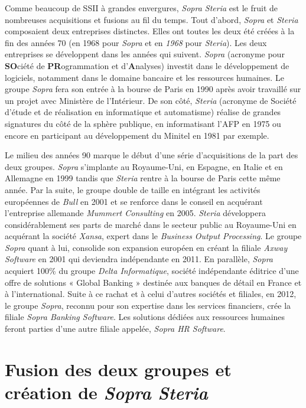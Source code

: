 \documentclass{polytech/polytech}
\begin{document}
Comme beaucoup de SSII à grandes envergures, \textit{Sopra Steria} est le fruit de nombreuses acquisitions et fusions au fil du temps. Tout d'abord, \textit{Sopra} et \textit{Steria} composaient deux entreprises distinctes. Elles ont toutes les deux été créées à la fin des années 70 (en 1968 pour \textit{Sopra} et en \textit{1968} pour \textit{Steria}). Les deux entreprises se développent dans les années qui suivent. \textit{Sopra} (acronyme pour \textbf{SO}ciété de \textbf{PR}ogrammation et d'\textbf{A}nalyses) investit dans le développement de logiciels, notamment dans le domaine bancaire et les ressources humaines. Le groupe \textit{Sopra} fera son entrée à la bourse de Paris en 1990 après avoir travaillé sur un projet avec Ministère de l'Intérieur. De son côté, \textit{Steria} (acronyme de Société d'étude et de réalisation en informatique et automatisme) réalise de grandes signatures du côté de la sphère publique, en informatisant l'AFP en 1975 ou encore en participant au développement du Minitel en 1981 par exemple. 

Le milieu des années 90 marque le début d'une série d'acquisitions de la part des deux groupes. \textit{Sopra} s'implante au Royaume-Uni, en Espagne, en Italie et en Allemagne en 1999 tandis que \textit{Steria} rentre à la bourse de Paris cette même année. Par la suite, le groupe double de taille en intégrant les activités européennes de \textit{Bull} en 2001 et se renforce dans le conseil en acquérant l'entreprise allemande \textit{Mummert Consulting} en 2005. \textit{Steria} développera considérablement ses parts de marché dans le secteur public au Royaume-Uni en acquérant la société \textit{Xansa}, expert dans le \textit{Business Output Processing}. Le groupe \textit{Sopra} quant à lui, consolide son expansion européen en créant la filiale \textit{Axway Software} en 2001 qui deviendra indépendante en 2011. En parallèle, \textit{Sopra} acquiert 100\% du groupe \textit{Delta Informatique}, société indépendante éditrice d'une offre de solutions « Global Banking » destinée aux banques de détail en France et à l’international. Suite à ce rachat et à celui d'autres sociétés et filiales, en 2012, le groupe \textit{Sopra}, reconnu pour son expertise dans les services financiers, crée la filiale \textit{Sopra Banking Software}. Les solutions dédiées aux ressources humaines feront parties d'une autre filiale appelée, \textit{Sopra HR Software}.

\section{Fusion des deux groupes et création de \textit{Sopra Steria}}
\end{document}
